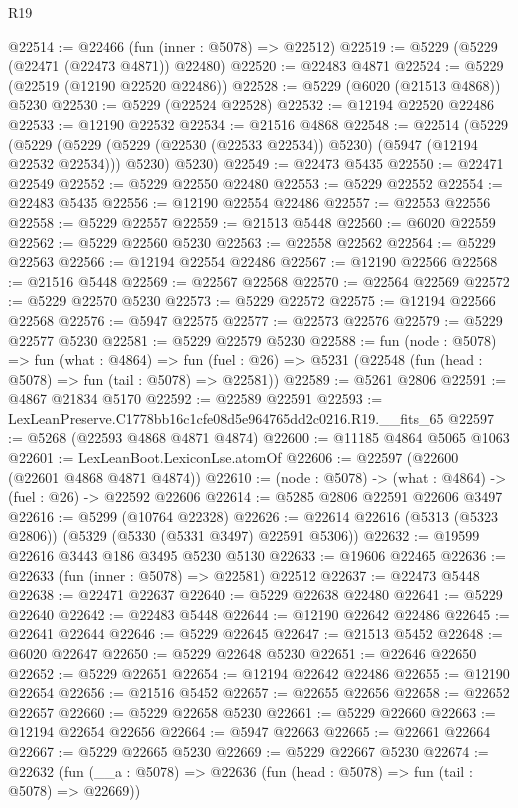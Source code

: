 \begin{lexlean}{R19}
\begin{coremodule}
@22514 := @22466 (fun (inner : @5078) => @22512)
@22519 := @5229 (@5229 (@22471 (@22473 @4871)) @22480)
@22520 := @22483 @4871
@22524 := @5229 (@22519 (@12190 @22520 @22486))
@22528 := @5229 (@6020 (@21513 @4868)) @5230
@22530 := @5229 (@22524 @22528)
@22532 := @12194 @22520 @22486
@22533 := @12190 @22532
@22534 := @21516 @4868
@22548 := @22514
    (@5229
      (@5229 (@5229 (@5229 (@22530 (@22533 @22534)) @5230) (@5947 (@12194 @22532 @22534))) @5230)
      @5230)
@22549 := @22473 @5435
@22550 := @22471 @22549
@22552 := @5229 @22550 @22480
@22553 := @5229 @22552
@22554 := @22483 @5435
@22556 := @12190 @22554 @22486
@22557 := @22553 @22556
@22558 := @5229 @22557
@22559 := @21513 @5448
@22560 := @6020 @22559
@22562 := @5229 @22560 @5230
@22563 := @22558 @22562
@22564 := @5229 @22563
@22566 := @12194 @22554 @22486
@22567 := @12190 @22566
@22568 := @21516 @5448
@22569 := @22567 @22568
@22570 := @22564 @22569
@22572 := @5229 @22570 @5230
@22573 := @5229 @22572
@22575 := @12194 @22566 @22568
@22576 := @5947 @22575
@22577 := @22573 @22576
@22579 := @5229 @22577 @5230
@22581 := @5229 @22579 @5230
@22588 := fun (node : @5078) =>
  fun (what : @4864) =>
  fun (fuel : @26) => @5231 (@22548 (fun (head : @5078) => fun (tail : @5078) => @22581))
@22589 := @5261 @2806
@22591 := @4867 @21834 @5170
@22592 := @22589 @22591
@22593 := LexLeanPreserve.C1778bb16c1cfe08d5e964765dd2c0216.R19.__fits_65
@22597 := @5268 (@22593 @4868 @4871 @4874)
@22600 := @11185 @4864 @5065 @1063
@22601 := LexLeanBoot.LexiconLse.atomOf
@22606 := @22597 (@22600 (@22601 @4868 @4871 @4874))
@22610 := (node : @5078) -> (what : @4864) -> (fuel : @26) -> @22592 @22606
@22614 := @5285 @2806 @22591 @22606 @3497
@22616 := @5299 (@10764 @22328)
@22626 := @22614 @22616 (@5313 (@5323 @2806)) (@5329 (@5330 (@5331 @3497) @22591 @5306))
@22632 := @19599 @22616 @3443 @186 @3495 @5230 @5130
@22633 := @19606 @22465
@22636 := @22633 (fun (inner : @5078) => @22581) @22512
@22637 := @22473 @5448
@22638 := @22471 @22637
@22640 := @5229 @22638 @22480
@22641 := @5229 @22640
@22642 := @22483 @5448
@22644 := @12190 @22642 @22486
@22645 := @22641 @22644
@22646 := @5229 @22645
@22647 := @21513 @5452
@22648 := @6020 @22647
@22650 := @5229 @22648 @5230
@22651 := @22646 @22650
@22652 := @5229 @22651
@22654 := @12194 @22642 @22486
@22655 := @12190 @22654
@22656 := @21516 @5452
@22657 := @22655 @22656
@22658 := @22652 @22657
@22660 := @5229 @22658 @5230
@22661 := @5229 @22660
@22663 := @12194 @22654 @22656
@22664 := @5947 @22663
@22665 := @22661 @22664
@22667 := @5229 @22665 @5230
@22669 := @5229 @22667 @5230
@22674 := @22632 (fun (__a : @5078) => @22636 (fun (head : @5078) => fun (tail : @5078) => @22669))

\end{coremodule}
\end{lexlean}
